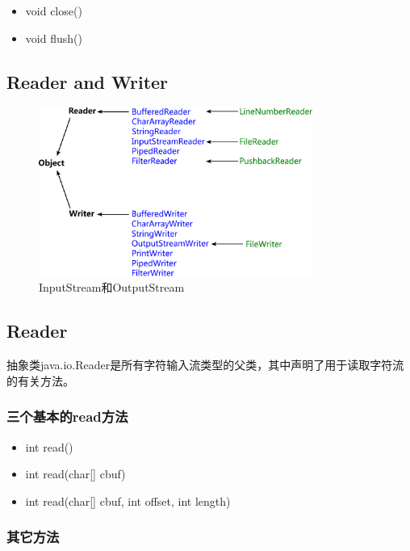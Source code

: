 \begin{itemize}
\item void close()
\item void flush()
\end{itemize}

\subsection{Reader and Writer}

\begin{figure}[htb]
\centering
\includegraphics[width=0.8\textwidth]{images/Advanced-IO-programming/fig-io-reader-and-writer.pdf}
\caption{InputStream和OutputStream}
\label{fig:fig-io-reader-and-writer}
\end{figure}

\subsection{Reader}

抽象类java.io.Reader是所有字符输入流类型的父类，其中声明了用于读取字符流的有关方法。

\subsubsection{三个基本的read方法}

\begin{itemize}
\item int read()
\item int read(char[] cbuf)
\item int read(char[] cbuf, int offset, int length)
\end{itemize}

\subsubsection{其它方法}

